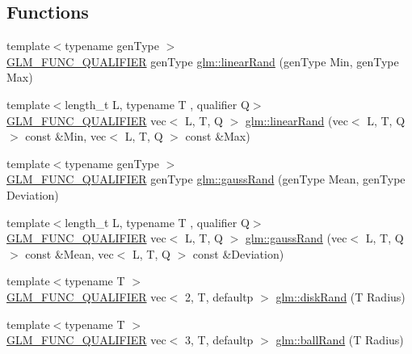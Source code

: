 \subsection*{Functions}
\begin{DoxyCompactItemize}
\item 
{\footnotesize template$<$typename gen\+Type $>$ }\\\mbox{\hyperlink{setup_8hpp_a33fdea6f91c5f834105f7415e2a64407}{G\+L\+M\+\_\+\+F\+U\+N\+C\+\_\+\+Q\+U\+A\+L\+I\+F\+I\+ER}} gen\+Type \mbox{\hyperlink{group__gtc__random_ga04e241ab88374a477a2c2ceadd2fa03d}{glm\+::linear\+Rand}} (gen\+Type Min, gen\+Type Max)
\item 
{\footnotesize template$<$length\+\_\+t L, typename T , qualifier Q$>$ }\\\mbox{\hyperlink{setup_8hpp_a33fdea6f91c5f834105f7415e2a64407}{G\+L\+M\+\_\+\+F\+U\+N\+C\+\_\+\+Q\+U\+A\+L\+I\+F\+I\+ER}} vec$<$ L, T, Q $>$ \mbox{\hyperlink{group__gtc__random_ga94731130c298a9ff5e5025fdee6d97a0}{glm\+::linear\+Rand}} (vec$<$ L, T, Q $>$ const \&Min, vec$<$ L, T, Q $>$ const \&Max)
\item 
{\footnotesize template$<$typename gen\+Type $>$ }\\\mbox{\hyperlink{setup_8hpp_a33fdea6f91c5f834105f7415e2a64407}{G\+L\+M\+\_\+\+F\+U\+N\+C\+\_\+\+Q\+U\+A\+L\+I\+F\+I\+ER}} gen\+Type \mbox{\hyperlink{group__gtc__random_ga5193a83e49e4fdc5652c084711083574}{glm\+::gauss\+Rand}} (gen\+Type Mean, gen\+Type Deviation)
\item 
{\footnotesize template$<$length\+\_\+t L, typename T , qualifier Q$>$ }\\\mbox{\hyperlink{setup_8hpp_a33fdea6f91c5f834105f7415e2a64407}{G\+L\+M\+\_\+\+F\+U\+N\+C\+\_\+\+Q\+U\+A\+L\+I\+F\+I\+ER}} vec$<$ L, T, Q $>$ \mbox{\hyperlink{namespaceglm_a6335eb662ef1aad00727b8dea15adb0e}{glm\+::gauss\+Rand}} (vec$<$ L, T, Q $>$ const \&Mean, vec$<$ L, T, Q $>$ const \&Deviation)
\item 
{\footnotesize template$<$typename T $>$ }\\\mbox{\hyperlink{setup_8hpp_a33fdea6f91c5f834105f7415e2a64407}{G\+L\+M\+\_\+\+F\+U\+N\+C\+\_\+\+Q\+U\+A\+L\+I\+F\+I\+ER}} vec$<$ 2, T, defaultp $>$ \mbox{\hyperlink{group__gtc__random_gaa0b18071f3f97dbf8bcf6f53c6fe5f73}{glm\+::disk\+Rand}} (T Radius)
\item 
{\footnotesize template$<$typename T $>$ }\\\mbox{\hyperlink{setup_8hpp_a33fdea6f91c5f834105f7415e2a64407}{G\+L\+M\+\_\+\+F\+U\+N\+C\+\_\+\+Q\+U\+A\+L\+I\+F\+I\+ER}} vec$<$ 3, T, defaultp $>$ \mbox{\hyperlink{group__gtc__random_ga7c53b7797f3147af68a11c767679fa3f}{glm\+::ball\+Rand}} (T Radius)

\end{DoxyCompactItemize}

